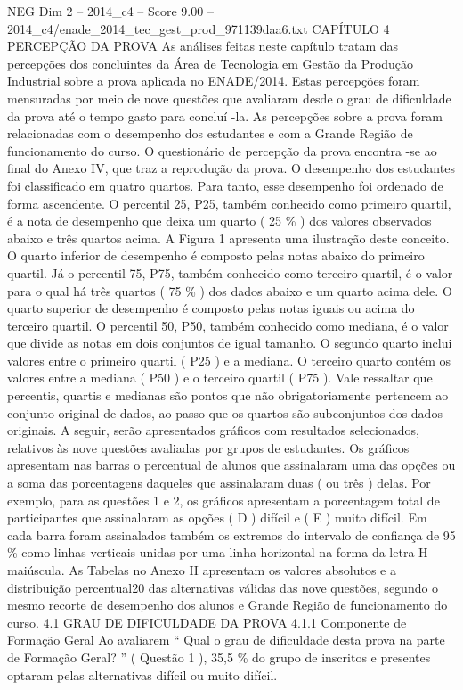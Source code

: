 \begin{textsample}{NEG Dim 2 – 2014\_c4 – Score 9.00 – 2014\_c4/enade\_2014\_tec\_gest\_prod\_971139daa6.txt}  \label{ex:f2_neg_323}
CAPÍTULO 4 PERCEPÇÃO DA PROVA As análises feitas neste capítulo tratam das percepções dos concluintes da Área de Tecnologia em Gestão da Produção Industrial sobre a prova aplicada no ENADE/2014.
Estas percepções foram mensuradas por meio de nove questões que avaliaram desde o grau de dificuldade da prova até o tempo gasto para concluí -la.
As percepções sobre a prova foram relacionadas com o desempenho dos estudantes e com a Grande Região de funcionamento do curso.
O questionário de percepção da prova encontra -se ao final do Anexo IV, que traz a reprodução da prova.
O desempenho dos estudantes foi classificado em quatro quartos.
Para tanto, esse desempenho foi ordenado de forma ascendente.
O percentil 25, P25, também conhecido como primeiro quartil, é a nota de desempenho que deixa um quarto ( 25 \% ) dos valores observados abaixo e três quartos acima.
A Figura 1 apresenta uma ilustração deste conceito.
O quarto inferior de desempenho é composto pelas notas abaixo do primeiro quartil.
Já o percentil 75, P75, também conhecido como terceiro quartil, é o valor para o qual há três quartos ( 75 \% ) dos dados abaixo e um quarto acima dele.
O quarto superior de desempenho é composto pelas notas iguais ou acima do terceiro quartil.
O percentil 50, P50, também conhecido como mediana, é o valor que divide as notas em dois conjuntos de igual tamanho.
O segundo quarto inclui valores entre o primeiro quartil ( P25 ) e a mediana.
O terceiro quarto contém os valores entre a mediana ( P50 ) e o terceiro quartil ( P75 ).
Vale ressaltar que percentis, quartis e medianas são pontos que não obrigatoriamente pertencem ao conjunto original de dados, ao passo que os quartos são subconjuntos dos dados originais.
A seguir, serão apresentados gráficos com resultados selecionados, relativos às nove questões avaliadas por grupos de estudantes.
Os gráficos apresentam nas barras o percentual de alunos que assinalaram uma das opções ou a soma das porcentagens daqueles que assinalaram duas ( ou três ) delas.
Por exemplo, para as questões 1 e 2, os gráficos apresentam a porcentagem total de participantes que assinalaram as opções ( D ) difícil e ( E ) muito difícil.
Em cada barra foram assinalados também os extremos do intervalo de confiança de 95 \% como linhas verticais unidas por uma linha horizontal na forma da letra H maiúscula.
As Tabelas no Anexo II apresentam os valores absolutos e a distribuição percentual20 das alternativas válidas das nove questões, segundo o mesmo recorte de desempenho dos alunos e Grande Região de funcionamento do curso. 4.1 GRAU DE DIFICULDADE DA PROVA 4.1.1 Componente de Formação Geral Ao avaliarem “ Qual o grau de dificuldade desta prova na parte de Formação Geral? ” ( Questão 1 ), 35,5 \% do grupo de inscritos e presentes optaram pelas alternativas difícil ou muito difícil.

\end{textsample}
